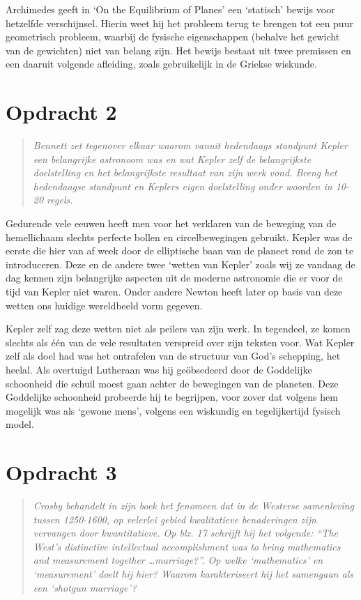 \documentclass[a4paper,11pt]{article}
\begin{document}
Archimedes geeft in `On the Equilibrium of Planes' een `statisch' bewijs voor
hetzelfde verschijnsel. Hierin weet hij het probleem terug te brengen tot een
puur geometrisch probleem, waarbij de fysische eigenschappen (behalve het
gewicht van de gewichten) niet van belang zijn. Het bewijs bestaat uit twee
premissen en een daaruit volgende afleiding, zoals gebruikelijk in de Griekse
wiskunde.


\section*{Opdracht 2}


\begin{quote}
\emph{Bennett zet tegenover elkaar waarom vanuit hedendaags standpunt Kepler
  een belangrijke astronoom was en wat Kepler zelf de belangrijkste
  doelstelling en het belangrijkste resultaat van zijn werk vond. Breng het
  hedendaagse standpunt en Keplers eigen doelstelling onder woorden in 10-20
  regels.}
\end{quote}


Gedurende vele eeuwen heeft men voor het verklaren van de beweging van de
hemellichaam slechts perfecte bollen en circelbewegingen gebruikt. Kepler was
de eerste die hier van af week door de elliptische baan van de planeet rond de
zon te introduceren. Deze en de andere twee `wetten van Kepler' zoals wij ze
vandaag de dag kennen zijn belangrijke aspecten uit de moderne astronomie die
er voor de tijd van Kepler niet waren. Onder andere Newton heeft later op
basis van deze wetten ons huidige wereldbeeld vorm gegeven.

Kepler zelf zag deze wetten niet als peilers van zijn werk. In tegendeel, ze
komen slechts als \'e\'en van de vele resultaten verspreid over zijn teksten
voor. Wat Kepler zelf als doel had was het ontrafelen van de structuur van
God's schepping, het heelal. Als overtuigd Lutheraan was hij ge\"obsedeerd
door de Goddelijke schoonheid die schuil moest gaan achter de bewegingen van
de planeten. Deze Goddelijke schoonheid probeerde hij te begrijpen, voor zover
dat volgens hem mogelijk was als `gewone mens', volgens een wiskundig en
tegelijkertijd fysisch model.


\section*{Opdracht 3}


\begin{quote}
\emph{Crosby behandelt in zijn boek het fenomeen dat in de Westerse
  samenleving tussen 1250-1600, op velerlei gebied kwalitatieve benaderingen
  zijn vervangen door kwantitatieve. Op blz. 17 schrijft hij het volgende:
  ``The West's distinctive intellectual accomplishment was to bring
  mathematics and measurement together \ldots marriage?''. Op welke
  `mathematics' en `measurement' doelt hij hier? Waarom karakteriseert hij het
  samengaan als een `shotgun marriage'?}
\end{quote}
\end{document}
